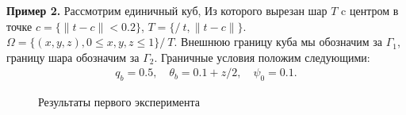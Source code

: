 \textbf{Пример 2.}
Рассмотрим единичный куб, Из которого  вырезан шар $T$ c центром в точке $c = \{\| t - c \| < 0.2\}$,
$T = \{/\ t, \|t - c \| \}$.
$\Omega = \{(x,y,z),  0 \leq x,y,z \leq 1 \} /\ T$.
Внешнюю границу куба мы обозначим за $\Gamma_1$, границу шара обозначим за $\Gamma_2$.
Граничные условия положим следующими:
\begin{gather*}
    q_b = 0.5, \quad
    \theta_b = 0.1 + z/2, \quad
    \psi_0 = 0.1.
\end{gather*}

\begin{figure}[H]
    \centering
    \caption{Результаты первого эксперимента}
    \label{fig:2}
\end{figure}